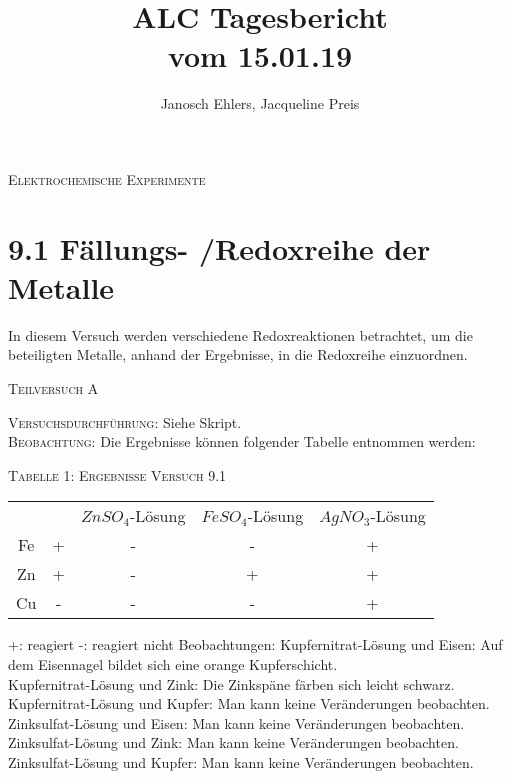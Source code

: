\documentclass[11pt, a4paper]{article}
\begin{document}
\title{ALC Tagesbericht\\ vom 15.01.19}
\author{Janosch Ehlers, Jacqueline Preis}
\maketitle

	\begin{center}
	\textsc{Elektrochemische Experimente}
	\end{center}

\section{9.1 Fällungs- /Redoxreihe der Metalle}

In diesem Versuch werden verschiedene Redoxreaktionen betrachtet, um die beteiligten Metalle, anhand der Ergebnisse, in die Redoxreihe einzuordnen.


\begin{center}
\textsc{Teilversuch A}
\end{center}

\textsc{Versuchsdurchführung:} Siehe Skript.\\

\textsc{Beobachtung:}\hspace{5mm} Die Ergebnisse können folgender Tabelle entnommen werden:\\
\begin{center}
\textsc{Tabelle 1: Ergebnisse Versuch 9.1}\\
\begin{tabular}{ccccc}
 & & $ZnSO_4$-Lösung & $FeSO_4$-Lösung & $AgNO_3$-Lösung\\
 Fe & + & - & - & +\\
 Zn & + & - & + & +\\
 Cu & - & - & - & +\\
\end{tabular}
\end{center}
+: reagiert
-: reagiert nicht
Beobachtungen:
Kupfernitrat-Lösung und Eisen: Auf dem Eisennagel bildet sich eine orange Kupferschicht.\\
Kupfernitrat-Lösung und Zink: Die Zinkspäne färben sich leicht schwarz.\\
Kupfernitrat-Lösung und Kupfer: Man kann keine Veränderungen beobachten. \\

Zinksulfat-Lösung und Eisen: Man kann keine Veränderungen beobachten.\\
Zinksulfat-Lösung und Zink: Man kann keine Veränderungen beobachten.\\
Zinksulfat-Lösung und Kupfer: Man kann keine Veränderungen beobachten.\\
\end{document}
